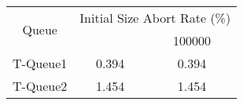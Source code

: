 \begin{tabular}{|c|c|c|}
\hline
\multirow{2}{*}{Queue} & \multicolumn{2}{c|}{Initial Size Abort Rate (\%)}\\\cline{2-3}& \qquad 10000 \qquad\quad & 100000\\
\hline
\hline
T-Queue1 & 0.394 & 0.394\\
T-Queue2 & 1.454 & 1.454\\
\hline\end{tabular}
